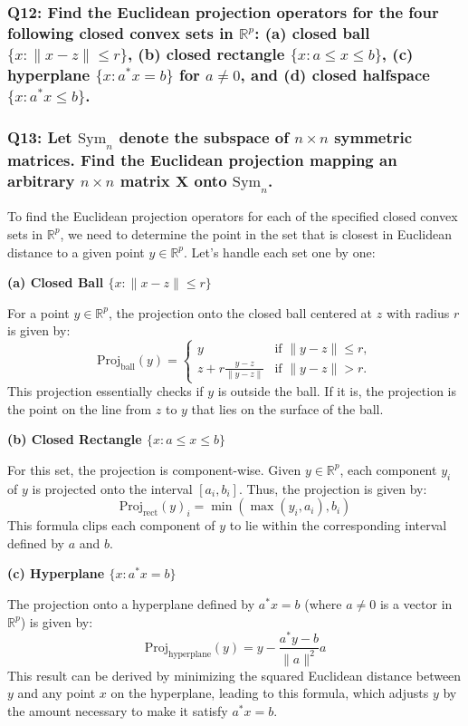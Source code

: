 \documentclass[8pt]{article}
\begin{document}
\subsubsection*{Q12: Find the Euclidean projection operators for the four following closed convex sets in \(\mathbb{R}^p\): (a) closed ball \(\{x : \|x - z\| \leq r\}\), (b) closed rectangle \(\{x : a \leq x \leq b\}\), (c) hyperplane \(\{x : a^* x = b\}\) for \(a \neq 0\), and (d) closed halfspace \(\{x : a^* x \leq b\}\).}

\subsubsection*{Q13: Let \(\mathrm{Sym}_n\) denote the subspace of \(n \times n\) symmetric matrices. Find the Euclidean projection mapping an arbitrary \(n \times n\) matrix \(\mathbf{X}\) onto \(\mathrm{Sym}_n\).}

To find the Euclidean projection operators for each of the specified closed convex sets in \(\mathbb{R}^p\), we need to determine the point in the set that is closest in Euclidean distance to a given point \(y \in \mathbb{R}^p\). Let's handle each set one by one:

\textbf{(a) Closed Ball \(\{x : \|x - z\| \leq r\}\)}

For a point \(y \in \mathbb{R}^p\), the projection onto the closed ball centered at \(z\) with radius \(r\) is given by:
\[ \text{Proj}_{\text{ball}}(y) = \begin{cases} 
y & \text{if } \|y - z\| \leq r, \\
z + r \frac{y - z}{\|y - z\|} & \text{if } \|y - z\| > r.
\end{cases} \]
This projection essentially checks if \(y\) is outside the ball. If it is, the projection is the point on the line from \(z\) to \(y\) that lies on the surface of the ball.

\textbf{(b) Closed Rectangle \(\{x : a \leq x \leq b\}\)}

For this set, the projection is component-wise. Given \(y \in \mathbb{R}^p\), each component \(y_i\) of \(y\) is projected onto the interval \([a_i, b_i]\). Thus, the projection is given by:
\[ \text{Proj}_{\text{rect}}(y)_i = \min(\max(y_i, a_i), b_i) \]
This formula clips each component of \(y\) to lie within the corresponding interval defined by \(a\) and \(b\).

\textbf{(c) Hyperplane \(\{x : a^* x = b\}\)}

The projection onto a hyperplane defined by \(a^* x = b\) (where \(a \neq 0\) is a vector in \(\mathbb{R}^p\)) is given by:
\[ \text{Proj}_{\text{hyperplane}}(y) = y - \frac{a^* y - b}{\|a\|^2} a \]
This result can be derived by minimizing the squared Euclidean distance between \(y\) and any point \(x\) on the hyperplane, leading to this formula, which adjusts \(y\) by the amount necessary to make it satisfy \(a^* x = b\).
\end{document}
